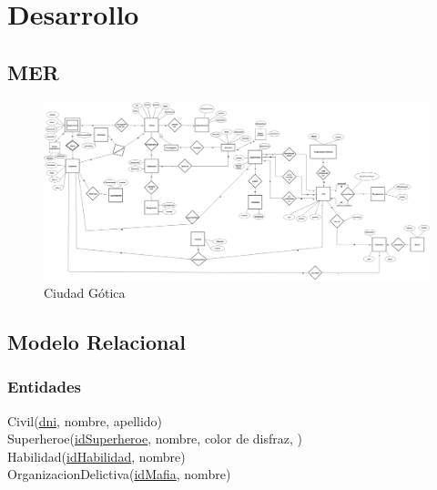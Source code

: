 \section{Desarrollo}

\subsection{MER} 

\begin{figure}[ht]
  \centering
  \includegraphics[scale=0.20]{MER/CiudadGotica.jpg}
  \caption{Ciudad Gótica}
  \label{fig:cg}
\end{figure}

\subsection{Modelo Relacional}\label{modelo-relacional}

\subsubsection{Entidades}\label{entidades}

Civil(\uline{dni}, nombre, apellido)\\

Superheroe(\uline{idSuperheroe}, nombre, color de disfraz, )\\

Habilidad(\uline{idHabilidad}, nombre)\\

OrganizacionDelictiva(\uline{idMafia}, nombre)\\

